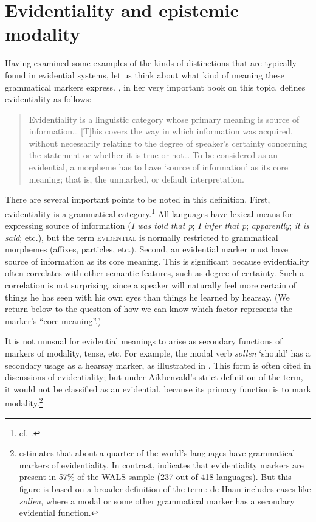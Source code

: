 \section{Evidentiality and epistemic modality}\label{sec:17.3}
\largerpage
Having examined some examples of the kinds of distinctions that are typically found in evidential systems, let us think about what kind of meaning these grammatical markers express. \citet[3]{Aikhenvald2004}, in her very important book on this topic, defines evidentiality as follows:


\begin{quote}
Evidentiality is a linguistic category whose primary meaning is source of information… [T]his covers the way in which information was acquired, without necessarily relating to the degree of speaker’s certainty concerning the statement or whether it is true or not… To be considered as an evidential, a morpheme has to have ‘source of information’ as its core meaning; that is, the unmarked, or default interpretation.
\end{quote}


There are several important points to be noted in this definition. First, evidentiality is a grammatical category.\footnote{cf. \citet[1]{Aikhenvald2004}.} All languages have lexical means for expressing source of information (\textit{I was told that p}; \textit{I infer that p}; \textit{apparently}; \textit{it is said}; etc.), but the term \textsc{evidential} is normally restricted to grammatical morphemes (affixes, particles, etc.). Second, an evidential marker must have source of information as its core meaning. This is significant because evidentiality often correlates with other semantic features, such as degree of certainty. Such a correlation is not surprising, since a speaker will naturally feel more certain of things he has seen with his own eyes than things he learned by hearsay. (We return below to the question of how we can know which factor represents the marker’s “core meaning”.)


\begin{sloppypar}
It is not unusual for evidential meanings to arise as secondary functions of markers of modality, tense, etc. For example, the  modal verb \textit{sollen} ‘should’ has a secondary usage as a hearsay marker, as illustrated in . This form is often cited in discussions of evidentiality; but under Aikhenvald’s strict definition of the term, it would not be classified as an evidential, because its primary function is to mark modality.\footnote{\citet[1]{Aikhenvald2004} estimates that about a quarter of the world’s languages have grammatical markers of evidentiality. In contrast, \citet{deHaan2013} indicates that evidentiality markers are present in 57\% of the WALS sample (237 out of 418 languages). But this figure is based on a broader definition of the term: de Haan includes cases like  \textit{sollen}, where a modal or some other grammatical marker has a secondary evidential function.}
\end{sloppypar}

